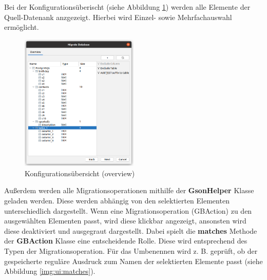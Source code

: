 	Bei der Konfigurationsüberischt (siehe Abbildung \ref{img:ui:overviewSingleAdd}) werden alle Elemente der Quell-Datenank anzgezeigt. Hierbei wird Einzel- sowie Mehrfachauswahl ermöglicht. \\
	\begin{figure}[h]
		\centering
		\includegraphics[width=0.5\textwidth]{images/ui/overviewSingleAdd}
		\caption{Konfigurationsübersicht (overview)}
		\label{img:ui:overviewSingleAdd}
	\end{figure}
	Außerdem werden alle Migrationsoperationen mithilfe der \textbf{GsonHelper} Klasse geladen werden. Diese werden abhängig von den selektierten Elementen unterschiedlich dargestellt. Wenn eine Migrationsoperation (GBAction) zu den ausgewählten Elementen passt, wird diese klickbar angezeigt, ansonsten wird diese deaktiviert und ausgegraut dargestellt. Dabei spielt die \textbf{matches} Methode der \textbf{GBAction} Klasse eine entscheidende Rolle. Diese wird entsprechend des Typen der Migrationsoperation. Für das Umbenennen wird z. B. geprüft, ob der gespeicherte reguläre Ausdruck zum Namen der selektierten Elemente passt (siehe Abbildung \ref{img:ui:matches}).
	
